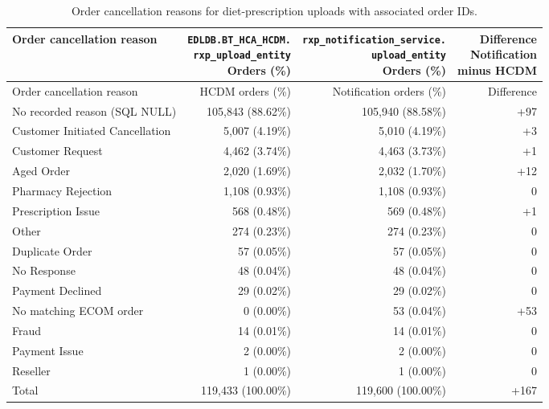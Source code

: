 \begin{longtable}{@{}lrrr@{}}
\caption{Order cancellation reasons for diet-prescription uploads with associated order IDs.}
\label{tab:diet-upload-source-cancel-reasons}\\
\toprule
Order cancellation reason & \shortstack{\texttt{EDLDB.BT\_HCA\_HCDM.}\\\texttt{rxp\_upload\_entity}\\Orders (\%)} & \shortstack{\texttt{rxp\_notification\_service.}\\\texttt{upload\_entity}\\Orders (\%)} & \shortstack{Difference\\Notification\\minus HCDM} \\
\midrule
\endfirsthead
\toprule Order cancellation reason & HCDM orders (\%) & Notification orders (\%) & Difference \\
\midrule
\endhead

{No recorded reason (SQL NULL)} & 105,843 (88.62\%) & 105,940 (88.58\%) & +97 \\

{Customer Initiated Cancellation} & 5,007 (4.19\%) & 5,010 (4.19\%) & +3 \\

{Customer Request} & 4,462 (3.74\%) & 4,463 (3.73\%) & +1 \\

{Aged Order} & 2,020 (1.69\%) & 2,032 (1.70\%) & +12 \\

{Pharmacy Rejection} & 1,108 (0.93\%) & 1,108 (0.93\%) & 0 \\

{Prescription Issue} & 568 (0.48\%) & 569 (0.48\%) & +1 \\

{Other} & 274 (0.23\%) & 274 (0.23\%) & 0 \\

{Duplicate Order} & 57 (0.05\%) & 57 (0.05\%) & 0 \\

{No Response} & 48 (0.04\%) & 48 (0.04\%) & 0 \\

{Payment Declined} & 29 (0.02\%) & 29 (0.02\%) & 0 \\

{No matching ECOM order} & 0 (0.00\%) & 53 (0.04\%) & +53 \\

{Fraud} & 14 (0.01\%) & 14 (0.01\%) & 0 \\

{Payment Issue} & 2 (0.00\%) & 2 (0.00\%) & 0 \\

{Reseller} & 1 (0.00\%) & 1 (0.00\%) & 0 \\
\midrule
{Total} & 119,433 (100.00\%) & 119,600 (100.00\%) & +167 \\
\bottomrule
\end{longtable}